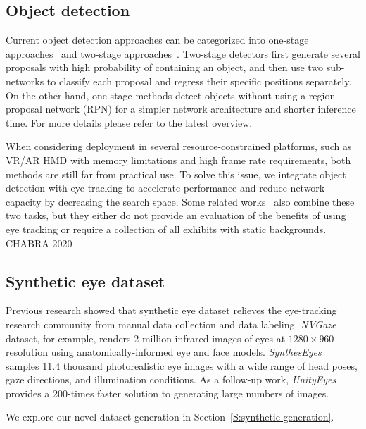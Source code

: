 \subsection{Object detection}

Current object detection approaches can be categorized into one-stage
approaches~\cite{redmon2016you, liu2016ssd, lin2017focal} and two-stage
approaches~\cite{girshick2014rich, girshick2015fast, ren2015faster, he2017mask}.
Two-stage detectors first generate several proposals with high probability of
containing an object, and then use two sub-networks to classify each
proposal and regress their specific positions separately. On the other hand,
one-stage methods detect objects without using a region proposal network (RPN)
for a simpler network architecture and shorter inference time. For more details
please refer to the latest overview\cite{liu2020deep}.

When considering deployment in several resource-constrained platforms, such as
VR/AR HMD with memory limitations and high frame rate requirements, both methods
are still far from practical use. To solve this issue, we integrate object
detection with eye tracking to accelerate performance and reduce network
capacity by decreasing the search space. Some related works~\cite{toyama2012gaze,
ishiguro2010aided, bonino2009blueprint} also combine these two tasks, but they
either do not provide an evaluation of the benefits of using eye tracking or
require a collection of all exhibits with static backgrounds.  CHABRA 2020 \cite{???}

\subsection{Synthetic eye dataset}\label{S:synthetic-dataset}

Previous research showed that synthetic eye dataset relieves the eye-tracking
research community from manual data collection and data labeling.
\emph{NVGaze}~\cite{kim2019nvgaze} dataset, for example, renders 2 million
infrared images of eyes at \(1280 \times 960\) resolution using
anatomically-informed eye and face models.
\emph{SynthesEyes}~\cite{wood2015rendering} samples 11.4 thousand photorealistic
eye images with a wide range of head poses, gaze directions, and illumination
conditions. As a follow-up work, \emph{UnityEyes}~\cite{wood2016learning}
provides a 200-times faster solution to generating large numbers of images.


We explore our novel dataset generation in Section~\ref{S:synthetic-generation}.
